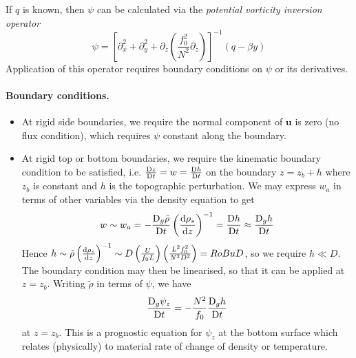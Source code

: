\documentclass{jknotes}
\begin{document}
If $q$ is known, then $\psi$ can be calculated via the \emph{potential
vorticity inversion operator}
\begin{equation}
	\psi = \left[\partial_x^2 + \partial_y^2 + \partial_z
	\left(\frac{f_0^2}{N^2} \partial_z\right)\right]^{-1} (q-\beta y)
\end{equation}
Application of this operator requires boundary conditions on $\psi$ or its
derivatives.

\paragraph{Boundary conditions.}
\begin{itemize}
	\item At rigid side boundaries, we require the normal component of $\symbf{u}$ is
		zero (no flux condition), which requires $\psi$ constant along the
		boundary.
	\item At rigid top or bottom boundaries, we require the kinematic boundary
		condition to be satisfied, i.e. $\frac{\mathrm{D} z}{\mathrm{D} t} = w =
		\frac{\mathrm{D} h}{\mathrm{D} t}$ on the boundary $z = z_b +h$ where $z_b$ is
		constant and $h$ is the topographic perturbation. We may express $w_a$
		in terms of other variables via the density equation to get
		\begin{equation}
			w \sim w_a = -\frac{\diffD_g \tilde{\rho}}{\diffD t}
			\left(\frac{\diffd \rho_s}{\diffd z}\right)^{-1} = \frac{\diffD
			h}{\diffD t} \approx \frac{\diffD_g h}{\diffD t}
		\end{equation}
		Hence $h \sim \tilde{\rho}\left(\frac{\diffd \rho_s}{\diffd
		z}\right)^{-1} \sim D \left( \frac{U}{f_0 L}\right) \left(\frac{L^2
		f_0^2}{N^2 D^2}\right) = \Ro \Bu D$, so we require $h \ll D$. The
		boundary condition may then be linearised, so that it can be applied
		at $z = z_b$.  Writing $\tilde{\rho}$ in terms of $\psi$, we have
		\begin{equation} 
			\frac{\mathrm{D}_g \psi_z}{\mathrm{D} t} = -\frac{N^2}{f_0}
			\frac{\mathrm{D}_g h}{\mathrm{D} t}
		\end{equation} 
		at $z = z_b$. This is a prognostic equation for $\psi_z$ at the bottom
		surface which relates (physically) to material rate of change of
		density or temperature.
\end{itemize}
\end{document}
